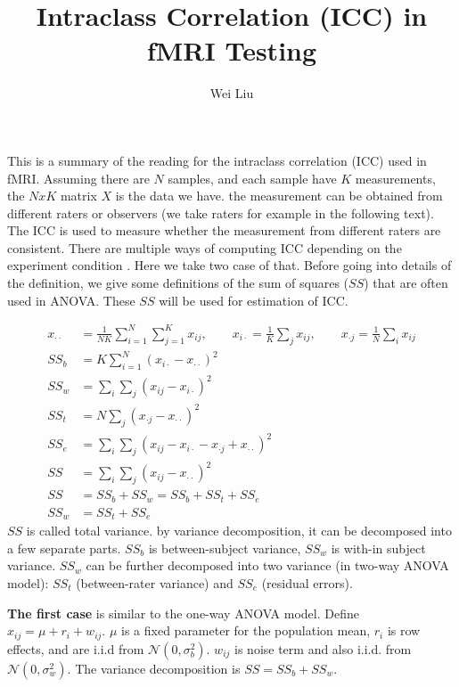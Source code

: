 \documentclass[12pt]{article}
\begin{document}
\title{Intraclass Correlation (ICC) in fMRI Testing}
\author{Wei Liu}
\maketitle

This is a summary of the reading for the intraclass correlation (ICC) used in
fMRI. Assuming there are $N$ samples, and each sample have $K$ measurements, the
$NxK$ matrix $X$ is the data we have. the measurement can be obtained from
different raters or observers (we take raters for example in the following
text). The ICC is used to measure whether the measurement from different raters
are consistent. There are multiple ways of computing ICC depending on the
experiment condition
\cite{mcgraw1996forming,weir2005quantifying,shrout1979intraclass}. Here we take
two case of that. Before going into details of the definition, we give some
definitions of the sum of squares ($SS$) that are often used in ANOVA. These $SS$
will be used for estimation of ICC.

\begin{align*}
  x_{\cdot\cdot} &= \frac{1}{NK}\sum_{i=1}^N\sum_{j=1}^Kx_{ij}, \qquad x_{i\cdot} = \frac{1}{K}\sum_j x_{ij}, \qquad x_{\cdot j} = \frac{1}{N}\sum_i x_{ij} \\
  SS_b &= K\sum_{i = 1}^N (x_{i\cdot} - x_{\cdot\cdot})^2 \\
  SS_w &= \sum_i \sum_j (x_{ij} - x_{i\cdot})^2 \\
  SS_t &= N\sum_j (x_{\cdot j} - x_{\cdot\cdot})^2 \\
  SS_e &= \sum_i\sum_j (x_{ij} - x_{i\cdot} - x_{\cdot j} + x_{\cdot\cdot})^2 \\
  SS &= \sum_i\sum_j (x_{ij} - x_{\cdot\cdot})^2 \\
  SS &= SS_b + SS_w = SS_b + SS_t + SS_e \\
  SS_w &= SS_t + SS_e
\end{align*}
$SS$ is called total variance. by variance decomposition, it can be decomposed into a few separate parts. $SS_b$ is between-subject variance, $SS_w$ is with-in subject variance. $SS_w$ can be further decomposed into two variance (in two-way ANOVA model): $SS_t$ (between-rater variance) and $SS_e$ (residual errors).

\textbf{The first case} is similar to the one-way ANOVA model. Define $x_{ij} = \mu + r_i + w_{ij}$. $\mu$ is a fixed parameter for the population mean, $r_i$ is row effects, and are i.i.d from $\mathcal{N}(0, \sigma_b^2)$.  $w_{ij}$ is noise term and also i.i.d. from $\mathcal{N}(0, \sigma_w^2)$. The variance decomposition is $SS = SS_b + SS_w$. 
\end{document}
